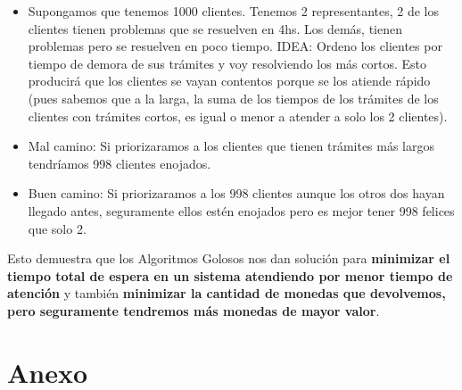 \documentclass[10pt,a4paper]{article}
\begin{document}
\begin{itemize}
    \begin{itemize}
        \item Supongamos que tenemos 1000 clientes. Tenemos 2 representantes, 2 de los clientes tienen problemas que se resuelven en 4hs. Los demás, tienen problemas pero se resuelven en poco tiempo. IDEA: Ordeno los clientes por tiempo de demora de sus trámites y voy resolviendo los más cortos. Esto producirá que los clientes se vayan contentos porque se los atiende rápido (pues sabemos que a la larga, la suma de los tiempos de los trámites de los clientes con trámites cortos, es igual o menor a atender a solo los 2 clientes).
        \item Mal camino: Si priorizaramos a los clientes que tienen trámites más largos tendríamos 998 clientes enojados. 
        \item Buen camino: Si priorizaramos a los 998 clientes aunque los otros dos hayan llegado antes, seguramente ellos estén enojados pero es mejor tener 998 felices que solo 2.
    \end{itemize}
\end{itemize}

Esto demuestra que los Algoritmos Golosos nos dan solución para \textbf{minimizar el tiempo total de espera en un sistema atendiendo por menor tiempo de atención} y también \textbf{minimizar la cantidad de monedas que devolvemos, pero seguramente tendremos más monedas de mayor valor}.


\section*{Anexo}
\end{document}
